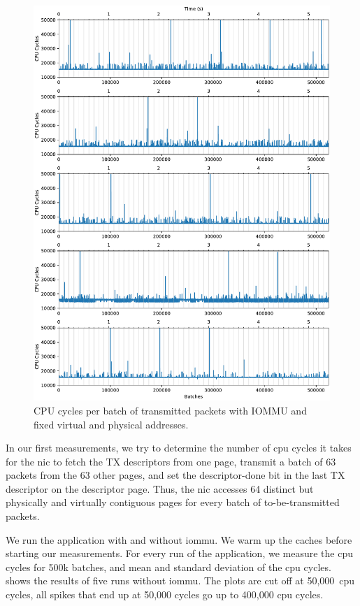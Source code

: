 \begin{figure}%
    \centering
    \includegraphics[width=1.0\textwidth]{figures/iotlb-baseline-iommu-pt-fixed}
    \caption{CPU cycles per batch of transmitted packets with IOMMU and fixed
virtual and physical addresses.}
    \label{fig:cycles-iommu-pt-fixed}
\end{figure}

In our first measurements, we try to determine the number of \ac{cpu} cycles it
takes for the \ac{nic} to fetch the TX descriptors from one page, transmit a
batch of 63 packets from the 63 other pages, and set the descriptor-done bit in
the last TX descriptor on the descriptor page. Thus, the \ac{nic} accesses 64
distinct but physically and virtually contiguous pages for every batch of
to-be-transmitted packets.

We run the application with and without \ac{iommu}. We warm up the caches before
starting our measurements. For every run of the application, we measure the
\ac{cpu} cycles for 500k batches, and mean and standard deviation of the
\ac{cpu} cycles.  shows the results of five runs
without \ac{iommu}. The plots are cut off at 50,000~\ac{cpu} cycles, all spikes
that end up at 50,000 cycles go up to 400,000 \ac{cpu} cycles.

